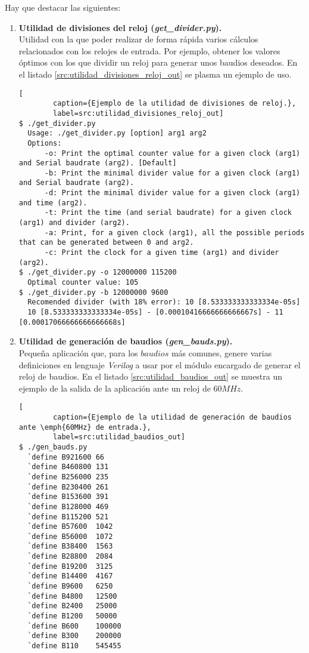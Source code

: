 Hay que destacar las siguientes:
\begin{enumerate}
    \item \textbf{Utilidad de divisiones del reloj (\emph{get\_divider.py}).} \\
    Utilidad con la que poder realizar de forma rápida varios cálculos relacionados con los relojes de entrada. Por ejemplo, obtener los valores óptimos con los que dividir un reloj para generar unos baudios deseados. En el listado \ref{src:utilidad_divisiones_reloj_out} se plasma un ejemplo de uso.
    \begin{lstlisting}[
        caption={Ejemplo de la utilidad de divisiones de reloj.},
        label=src:utilidad_divisiones_reloj_out]
$ ./get_divider.py
  Usage: ./get_divider.py [option] arg1 arg2
  Options: 
      -o: Print the optimal counter value for a given clock (arg1) and Serial baudrate (arg2). [Default]
      -b: Print the minimal divider value for a given clock (arg1) and Serial baudrate (arg2).
      -d: Print the minimal divider value for a given clock (arg1) and time (arg2).
      -t: Print the time (and serial baudrate) for a given clock (arg1) and divider (arg2).
      -a: Print, for a given clock (arg1), all the possible periods that can be generated between 0 and arg2.
      -c: Print the clock for a given time (arg1) and divider (arg2).
$ ./get_divider.py -o 12000000 115200
  Optimal counter value: 105
$ ./get_divider.py -b 12000000 9600
  Recomended divider (with 18% error): 10 [8.533333333333334e-05s]
  10 [8.533333333333334e-05s] - [0.00010416666666666667s] - 11 [0.00017066666666666668s]          
    \end{lstlisting}
    
    \item \textbf{Utilidad de generación de baudios (\emph{gen\_bauds.py}).} \\
    Pequeña aplicación que, para los $baudios$ más comunes, genere varias definiciones en lenguaje \emph{Verilog} a usar por el módulo encargado de generar el reloj de baudios. En el listado \ref{src:utilidad_baudios_out} se muestra un ejemplo de la salida de la aplicación ante un reloj de $60MHz$.
    \begin{lstlisting}[
        caption={Ejemplo de la utilidad de generación de baudios ante \emph{60MHz} de entrada.},
        label=src:utilidad_baudios_out]
$ ./gen_bauds.py
  `define B921600 66
  `define B460800 131
  `define B256000 235
  `define B230400 261
  `define B153600 391
  `define B128000 469
  `define B115200 521
  `define B57600  1042
  `define B56000  1072
  `define B38400  1563
  `define B28800  2084
  `define B19200  3125
  `define B14400  4167
  `define B9600   6250
  `define B4800   12500
  `define B2400   25000
  `define B1200   50000
  `define B600    100000
  `define B300    200000
  `define B110    545455
    \end{lstlisting}
    

\end{enumerate}
